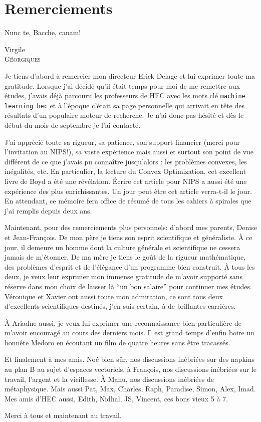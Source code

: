 \section*{Remerciements}

\epigraph{Nunc te, Bacche, canam!}{Virgile\\\textsc{Géorgiques}}

Je tiens d'abord à remercier mon directeur Erick Delage et lui exprimer toute ma
gratitude. Lorsque j'ai décidé qu'il était temps pour moi de me remettre aux études,
j'avais déjà parcouru les professeurs de HEC avec les mots clé
{\small\verb+machine learning hec+} et à l'époque c'était sa page personnelle qui arrivait
en tête des résultats d'un populaire moteur de recherche. Je n'ai donc pas hésité et dès
le début du mois de septembre je l'ai contacté.

J'ai apprécié toute sa rigueur, sa patience, son support financier (merci pour
l'invitation au NIPS!), sa vaste expérience mais aussi et surtout son point de vue
différent de ce que j'avais pu connaître jusqu'alors : les problèmes convexes, les
inégalités, etc. En particulier, la lecture du Convex Optimization, cet excellent livre de
Boyd a été une révélation. Écrire cet article pour NIPS a aussi été une expérience des
plus enrichissantes. Un jour peut être cet article verra-t-il le jour. En attendant, ce
mémoire fera office de résumé de tous les cahiers à spirales que j'ai remplis depuis deux
ans.

Maintenant, pour des remerciements plus personnels: d'abord mes parents, Denise et
Jean-François. De mon père je tiens son esprit scientifique et généraliste. À ce jour, il
demeure un homme dont la culture générale et scientifique ne cessera jamais de
m'étonner. De ma mère je tiens le goût de la rigueur mathématique, des problèmes d'esprit
et de l'élégance d'un programme bien construit. À tous les deux, je veux leur exprimer mon
immense gratitude de m'avoir supporté sans réserve dans mon choix de laisser là ``un bon
salaire'' pour continuer mes études. Véronique et Xavier ont aussi toute mon admiration,
ce sont tous deux d'excellents scientifiques destinés, j'en suis certain, à de brillantes
carrières.

À Ariadne aussi, je veux lui exprimer une reconnaissance bien particulière de m'avoir
encouragé au cours des derniers mois. Il est grand temps d'enfin boire un honnête Medoro
en écoutant un film de quatre heures sans être tracassés.

Et finalement à mes amis. Noé bien sûr, nos discussions inébriées sur des napkins au plan
B au sujet d'espaces vectoriels, à François, nos discussions inébriées sur le travail,
l'argent et la vieillesse. À Manu, nos discussions inébriées de métaphysique. Mais aussi
Pat, Max, Charles, Raph, Paradise, Simon, Alex, Imad. Mes amis d'HEC aussi, Edith, Nidhal,
JS, Vincent, ces bons vieux 5 à 7.

Merci à tous et maintenant au travail. 

